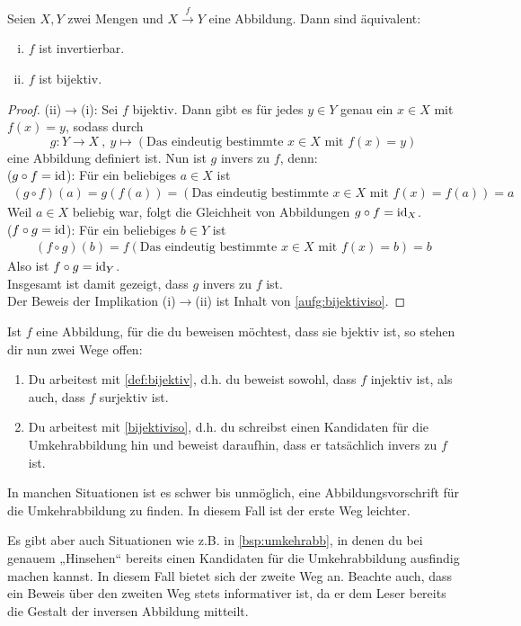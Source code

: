 \begin{satz} \label{bijektiviso}
    Seien $X,Y$ zwei Mengen und $X\xrightarrow{f} Y$ eine Abbildung. Dann sind äquivalent:
    \begin{enumerate}[(i)]
        \item $f$ ist invertierbar.
        \item $f$ ist bijektiv.
    \end{enumerate}
\end{satz}
\begin{proof}
    (ii)$\to$(i): Sei $f$ bijektiv. Dann gibt es für jedes $y\in Y$ genau ein $x\in X$ mit $f(x)=y$, sodass durch
        \[ g : Y\to X \ ,\ y \mapsto (\text{Das eindeutig bestimmte $x\in X$ mit $f(x)=y$}) \]
    eine Abbildung definiert ist. Nun ist $g$ invers zu $f$, denn: \\[0.5em]
    ($g\circ f=\mathrm{id}$): Für ein beliebiges $a\in X$ ist
    \begin{align*}
        (g\circ f)(a) = g(f(a)) = (\text{Das eindeutig bestimmte $x\in X$ mit $f(x)=f(a)$}) = a
    \end{align*}
    Weil $a\in X$ beliebig war, folgt die Gleichheit von Abbildungen $g\circ f=\mathrm{id}_X$. \\[0.5em]
    ($f\circ g=\mathrm{id}$): Für ein beliebiges $b\in Y$ ist
    \begin{align*}
        (f\circ g)(b) = f(\text{Das eindeutig bestimmte $x\in X$ mit $f(x)=b$}) = b
    \end{align*}
    Also ist $f\circ g=\mathrm{id}_Y$. \\[0.5em]
    Insgesamt ist damit gezeigt, dass $g$ invers zu $f$ ist. \\[0.5em]
    Der Beweis der Implikation (i)$\to$(ii) ist Inhalt von \cref{aufg:bijektiviso}.
\end{proof}


\begin{bem}
    Ist $f$ eine Abbildung, für die du beweisen möchtest, dass sie bjektiv ist, so stehen dir nun zwei Wege offen:
    \begin{enumerate}
        \item Du arbeitest mit \cref{def:bijektiv}, d.h. du beweist sowohl, dass $f$ injektiv ist, als auch, dass $f$ surjektiv ist.
        \item Du arbeitest mit \cref{bijektiviso}, d.h. du schreibst einen Kandidaten für die Umkehrabbildung hin und beweist daraufhin, dass er tatsächlich invers zu $f$ ist.
    \end{enumerate}
    In manchen Situationen ist es schwer bis unmöglich, eine Abbildungsvorschrift für die Umkehrabbildung zu finden. In diesem Fall ist der erste Weg leichter.
    
    Es gibt aber auch Situationen wie z.B. in \cref{bsp:umkehrabb}, in denen du bei genauem „Hinsehen“ bereits einen Kandidaten für die Umkehrabbildung ausfindig machen kannst. In diesem Fall bietet sich der zweite Weg an. Beachte auch, dass ein Beweis über den zweiten Weg stets informativer ist, da er dem Leser bereits die Gestalt der inversen Abbildung mitteilt.
\end{bem}


